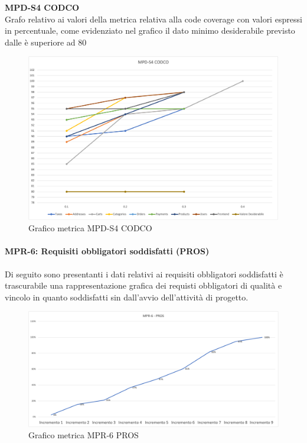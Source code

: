 \begin{center}
    \textbf{MPD-S4 CODCO} \\
    Grafo relativo ai valori della metrica relativa alla code coverage con valori espressi in percentuale, come evidenziato nel 
        grafico il dato minimo desiderabile previsto dalle  è superiore ad 80
        \begin{figure}[!htb]
        \centering
        \includegraphics[scale=0.50]{res/images/ra/ra_codco.png}
        \caption{Grafico metrica MPD-S4 CODCO}
    \end{figure}
    \begin{center}
    \end{center}
\end{center}

\newpage
\paragraph{MPR-6: Requisiti obbligatori soddisfatti (PROS)}\label{_SV}
Di seguito sono presentanti i dati relativi ai requisiti obbligatori soddisfatti è trascurabile una rappresentazione grafica dei requisti obbligatori di 
qualità e vincolo in quanto soddisfatti sin dall'avvio dell'attività di progetto.

\begin{center}
        \begin{figure}[!htb]
        \centering
        \includegraphics[scale=0.40]{res/images/ra/RA_PROS.png}
        \caption{Grafico metrica MPR-6 PROS}
    \end{figure}
    \begin{center}
    \end{center}
\end{center}

